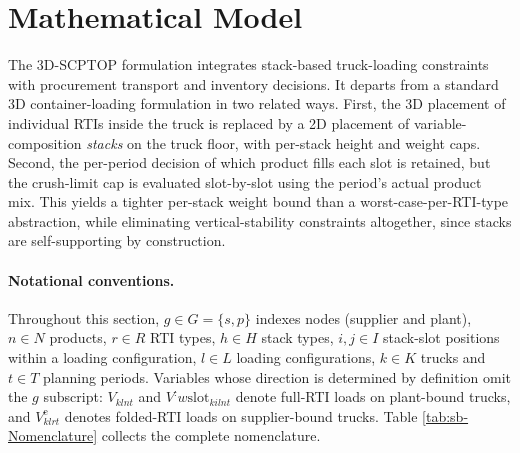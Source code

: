 \section{Mathematical Model}
\label{sec:model}

The 3D-SCPTOP formulation integrates stack-based truck-loading
constraints with procurement transport and inventory decisions. It
departs from a standard 3D container-loading formulation in two
related ways. First, the 3D placement of individual RTIs inside the
truck is replaced by a 2D placement of variable-composition
\emph{stacks} on the truck floor, with per-stack height and weight
caps. Second, the per-period decision of which product fills each slot
is retained, but the crush-limit cap is evaluated slot-by-slot using
the period's actual product mix. This yields a tighter per-stack
weight bound than a worst-case-per-RTI-type abstraction, while
eliminating vertical-stability constraints altogether, since stacks
are self-supporting by construction.

\paragraph{Notational conventions.}
Throughout this section, $g\in G=\{s,p\}$ indexes nodes (supplier and
plant), $n\in N$ products, $r\in R$ RTI types, $h\in H$ stack types,
$i,j\in I$ stack-slot positions within a loading configuration,
$l\in L$ loading configurations, $k\in K$ trucks and $t\in T$ planning
periods. Variables whose direction is determined by definition omit
the $g$ subscript: $V_{klnt}$ and $V^:w{\mathrm{slot}}_{kilnt}$ denote
full-RTI loads on plant-bound trucks, and $V^{\mathrm{e}}_{klrt}$
denotes folded-RTI loads on supplier-bound trucks. Table
\ref{tab:sb-Nomenclature} collects the complete nomenclature.

